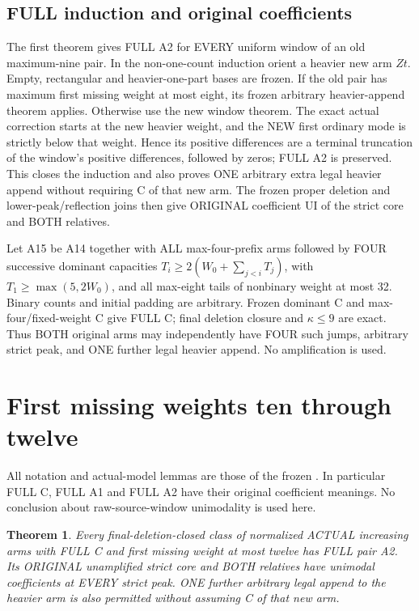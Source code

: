 \documentclass[11pt]{article}
\newtheorem{theorem}[proposition]{Theorem}
\begin{document}
\subsection{FULL induction and original coefficients}
The first theorem gives FULL A2 for EVERY uniform window of an old
maximum-nine pair. In the non-one-count induction orient a heavier
new arm $Zt$. Empty, rectangular and heavier-one-part bases are frozen.
If the old pair has maximum first missing weight at most eight, its
frozen arbitrary heavier-append theorem applies. Otherwise use the new
window theorem. The exact actual correction starts at the new heavier
weight, and the NEW first ordinary mode is strictly below that weight.
Hence its positive differences are a terminal truncation of the window's
positive differences, followed by zeros; FULL A2 is preserved.
This closes the induction and also proves ONE arbitrary extra legal
heavier append without requiring C of that new arm. The frozen proper
deletion and lower-peak/reflection joins then give ORIGINAL coefficient
UI of the strict core and BOTH relatives.

Let A15 be A14 together with ALL max-four-prefix arms followed by FOUR
successive dominant capacities $T_i\ge2(W_0+\sum_{j<i}T_j)$, with
$T_1\ge\max(5,2W_0)$, and all max-eight tails of nonbinary weight at
most 32. Binary counts and initial padding are arbitrary. Frozen
dominant C and max-four/fixed-weight C give FULL C; final deletion
closure and $\kappa\le9$ are exact. Thus BOTH original arms may
independently have FOUR such jumps, arbitrary strict peak, and ONE
further legal heavier append. No amplification is used.


\section{First missing weights ten through twelve}

\par\medskip

All notation and actual-model lemmas are those of the frozen
{\normalfont{}}.
In particular FULL C, FULL A1 and FULL A2 have their original coefficient
meanings. No conclusion about raw-source-window unimodality is used here.

\begin{theorem}
Every final-deletion-closed class of normalized ACTUAL increasing arms
with FULL C and first missing weight at most twelve has FULL pair A2.
Its ORIGINAL unamplified strict core and BOTH relatives have unimodal
coefficients at EVERY strict peak. ONE further arbitrary legal append
to the heavier arm is also permitted without assuming C of that new arm.
\end{theorem}
\end{document}
